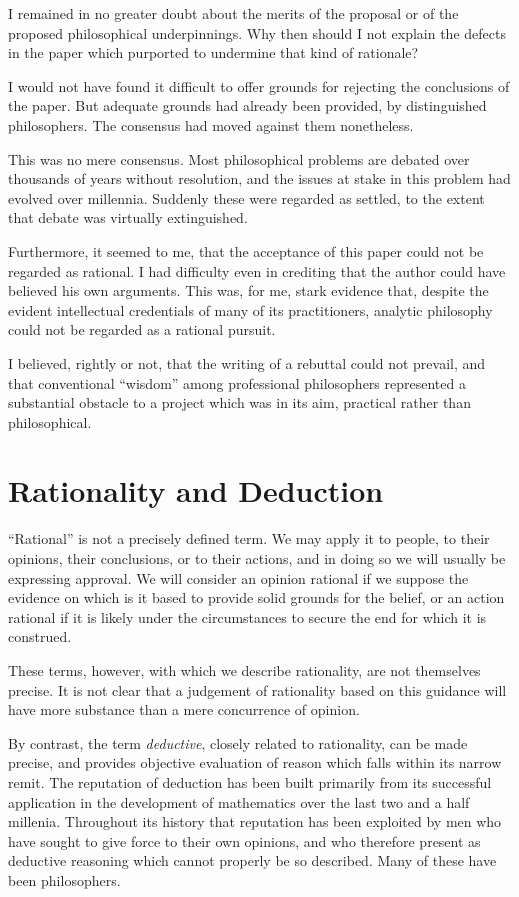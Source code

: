 I remained in no greater doubt about the merits of the proposal or of the proposed philosophical underpinnings.
Why then should I not explain the defects in the paper which purported to undermine that kind of rationale?

I would not have found it difficult to offer grounds for rejecting the conclusions of the paper.
But adequate grounds had already been provided, by distinguished philosophers.
The consensus had moved against them nonetheless.

This was no mere consensus.
Most philosophical problems are debated over thousands of years without resolution, and the issues at stake in this problem had evolved over millennia.
Suddenly these were regarded as settled, to the extent that debate was virtually extinguished.

Furthermore, it seemed to me, that the acceptance of this paper could not be regarded as rational.
I had difficulty even in crediting that the author could have believed his own arguments.
This was, for me, stark evidence that, despite the evident intellectual credentials of many of its practitioners, analytic philosophy could not be regarded as a rational pursuit.

I believed, rightly or not, that the writing of a rebuttal could not prevail, and that conventional ``wisdom'' among professional philosophers represented a substantial obstacle to a project which was in its aim, practical rather than philosophical.


\chapter{Rationality and Deduction}\label{RationalityDeduction}

``Rational'' is not a precisely defined term.
We may apply it to people, to their opinions, their conclusions, or to their actions, and in doing so we will usually be expressing approval.
We will consider an opinion rational if we suppose the evidence on which is it based to provide solid grounds for the belief, or an action rational if it is likely under the circumstances to secure the end for which it is construed.

These terms, however, with which we describe rationality, are not themselves precise.
It is not clear that a judgement of rationality based on this guidance will have more substance than a mere concurrence of opinion.

By contrast, the term {\it deductive}, closely related to rationality, can be made precise, and provides objective evaluation of reason which falls within its narrow remit.
The reputation of deduction has been built primarily from its successful application in the development of mathematics over the last two and a half millenia.
Throughout its history that reputation has been exploited by men who have sought to give force to their own opinions, and who therefore present as deductive reasoning which cannot properly be so described.
Many of these have been philosophers.


